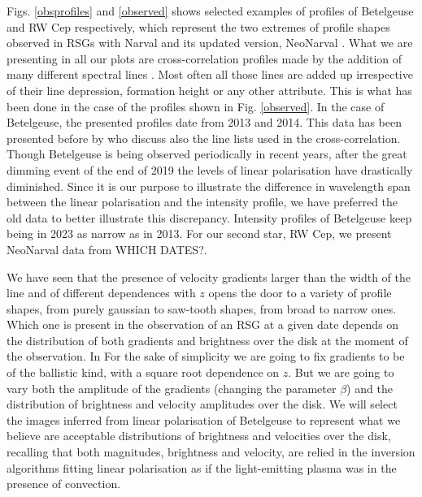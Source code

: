 \documentclass{/Users/art2/TeX/aanda/aa}
\begin{document}
Figs. \ref{obsprofiles} and \ref{observed} shows selected examples of profiles of Betelgeuse and RW Cep respectively, which represent the two extremes of profile shapes 
observed in RSGs with Narval and its updated version, NeoNarval \cite[see][for a description of both instruments and the data reduction procedures]{lopez_ariste_three-dimensional_2022,Donati}.
What we are presenting in all our plots are cross-correlation profiles made by the addition of many different spectral lines  \citep{josselin_atmospheric_2007}. Most 
often all those lines are added up irrespective of their line depression, formation height or any other 
attribute. This is what has been done in the case of the profiles shown in  Fig. \ref{observed}. In the case of Betelgeuse, the presented profiles date from 2013 and 2014. This data has been presented before by 
\cite{auriere_discovery_2016} who discuss also the line lists used in the cross-correlation. Though Betelgeuse is being observed periodically 
in recent years, after the great dimming event of the end of 2019 the levels of linear polarisation have drastically diminished. Since 
it is our purpose to illustrate the difference in wavelength span between the linear polarisation and the intensity profile, we have 
preferred the old data to better illustrate this discrepancy. Intensity profiles of Betelgeuse keep being in 2023 as narrow as in 2013. For our 
second star, RW Cep, we present NeoNarval data from 
WHICH DATES?.  

We have seen that the presence of velocity gradients larger than the width of the line and of different dependences with $z$ opens the door to a 
variety of profile shapes, from purely gaussian to saw-tooth shapes, from broad to narrow ones. 
Which one is present in the observation 
of an RSG at a given date depends on the distribution of both gradients and brightness over the disk at the moment of the observation. In 
For the sake of simplicity we are going to fix gradients to be of the ballistic kind, with a square root dependence on $z$. But we are going 
to vary both the amplitude of the gradients (changing the parameter $\beta$) and the distribution of brightness and velocity amplitudes over 
the disk. We will select the images inferred from linear polarisation of Betelgeuse to represent what we believe are acceptable 
distributions of brightness and velocities over the disk, recalling that both magnitudes, brightness and velocity, are relied in the 
inversion algorithms fitting linear polarisation as if the light-emitting plasma was in the presence of convection. 
\end{document}
